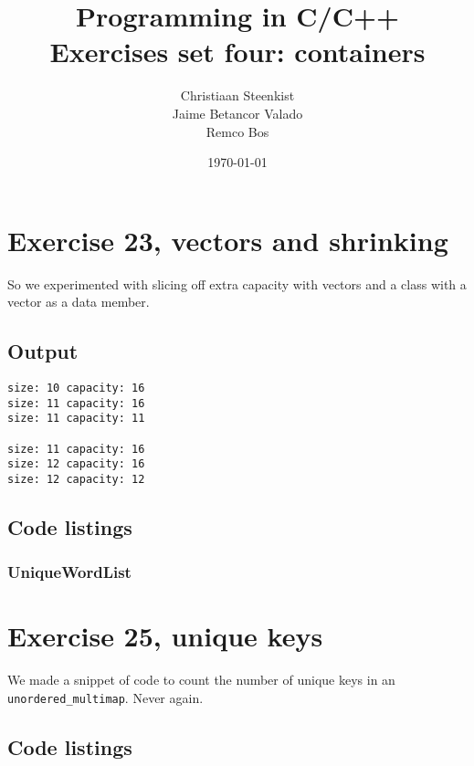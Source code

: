 \documentclass[11pt]{article}
\begin{document}
\title{Programming in C/C++ \\
       Exercises set four: containers
}
\date{\today}
\author{Christiaan Steenkist \\
Jaime Betancor Valado \\
Remco Bos \\
}

\maketitle
\section*{Exercise 23, vectors and shrinking}
So we experimented with slicing off extra capacity with vectors and a class with a vector as a data member.

\subsection*{Output}
\begin{lstlisting}
size: 10 capacity: 16
size: 11 capacity: 16
size: 11 capacity: 11

size: 11 capacity: 16
size: 12 capacity: 16
size: 12 capacity: 12
\end{lstlisting}

\subsection*{Code listings}







\subsubsection*{UniqueWordList}










\section*{Exercise 25, unique keys}
We made a snippet of code to count the number of unique keys in an \texttt{unordered\_multimap}.
Never again.

\subsection*{Code listings}

\end{document}
